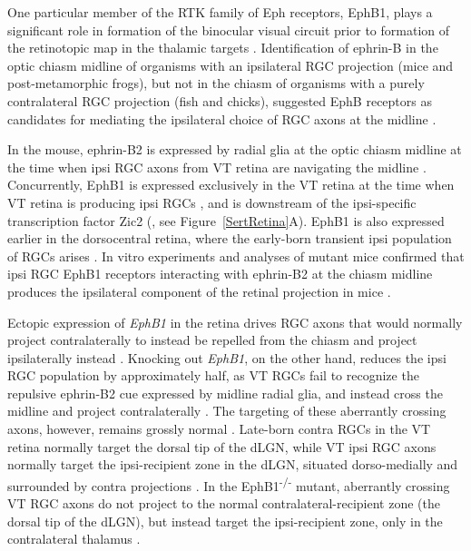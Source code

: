 One particular member of the RTK family of Eph receptors, EphB1, plays a significant role in formation of the binocular visual circuit prior to formation of the retinotopic map in the thalamic targets \cite{petros2008retinal,williams2003ephrin,lee2008zic2}.
Identification of ephrin-B in the optic chiasm midline of organisms with an ipsilateral RGC projection (mice and post-metamorphic frogs), but not in the chiasm of organisms with a purely contralateral RGC projection (fish and chicks), suggested EphB receptors as candidates for mediating the ipsilateral choice of RGC axons at the midline \cite{nakagawa2000ephrin}.

In the mouse, ephrin-B2 is expressed by radial glia at the optic chiasm midline at the time when ipsi RGC axons from VT retina are navigating the midline \cite{williams2003ephrin}.
Concurrently, EphB1 is expressed exclusively in the VT retina at the time when VT retina is producing ipsi RGCs \cite{williams2003ephrin}, and is downstream of the ipsi-specific transcription factor Zic2 (, see Figure~\ref{SertRetina}A).
EphB1 is also expressed earlier in the dorsocentral retina, where the early-born transient ipsi population of RGCs arises \cite{williams2003ephrin,drager1985birth}.
In vitro experiments and analyses of mutant mice confirmed that ipsi RGC EphB1 receptors interacting with ephrin-B2 at the chiasm midline produces the ipsilateral component of the retinal projection in mice \cite{williams2003ephrin,petros2010ephrin,petros2009specificity,chenaux2011forward}.

Ectopic expression of \emph{EphB1} in the retina drives RGC axons that would normally project contralaterally to instead be repelled from the chiasm and project ipsilaterally instead \cite{petros2009specificity}.
Knocking out \emph{EphB1}, on the other hand, reduces the ipsi RGC population by approximately half, as VT RGCs fail to recognize the repulsive ephrin-B2 cue expressed by midline radial glia, and instead cross the midline and project contralaterally \cite{williams2003ephrin}.
The targeting of these aberrantly crossing axons, however, remains grossly normal \cite{rebsam2009switching}.
Late-born contra RGCs in the VT retina normally target the dorsal tip of the dLGN, while VT ipsi RGC axons normally target the ipsi-recipient zone in the dLGN, situated dorso-medially and surrounded by contra projections \cite{rebsam2009switching,pfeiffenberger2006ephrin}.
In the EphB1\textsuperscript{-/-} mutant, aberrantly crossing VT RGC axons do not project to the normal contralateral-recipient zone (the dorsal tip of the dLGN), but instead target the ipsi-recipient zone, only in the contralateral thalamus \cite{rebsam2009switching}.

